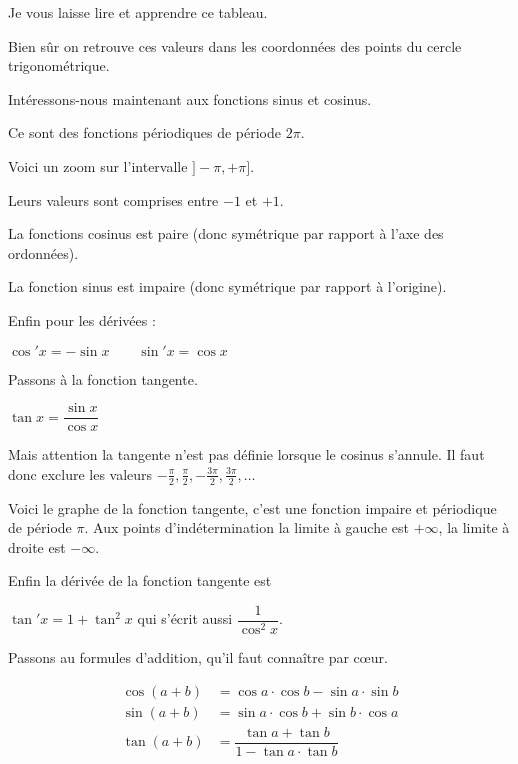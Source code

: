 Je vous laisse lire et apprendre ce tableau.

Bien sûr on retrouve ces valeurs
dans les coordonnées des points du cercle trigonométrique.


\diapo

Intéressons-nous maintenant aux fonctions sinus et cosinus.

Ce sont des fonctions périodiques de période $2\pi$.

\change

Voici un zoom sur l'intervalle $]-\pi,+\pi]$.



Leurs valeurs sont comprises entre $-1$ et $+1$.

La fonctions cosinus est paire (donc symétrique par rapport à l'axe des ordonnées).

La fonction sinus est impaire (donc symétrique par rapport à l'origine).

\change

Enfin pour les dérivées :

$\cos' x = -\sin x \qquad \sin'x=\cos x$



\diapo

Passons à la fonction tangente.

$\tan x = \dfrac{\sin x}{\cos x}$

Mais attention la tangente n'est pas définie lorsque le cosinus s'annule.
Il faut donc exclure les valeurs 
$-\frac\pi2, \frac\pi2, -\frac{3\pi}{2}, \frac{3\pi}{2},\ldots $

Voici le graphe de la fonction tangente, c'est une fonction 
impaire et périodique de période $\pi$. Aux points d'indétermination
la limite à gauche est $+\infty$, la limite à droite est $-\infty$.


Enfin la dérivée de la fonction tangente est 

$\tan' x = 1+\tan^2x$ qui s'écrit aussi $\dfrac{1}{\cos^2x}$.


\diapo

Passons au formules d'addition, qu'il faut connaître par c\oe ur.

\begin{align*}
\cos(a+b) &= \cos a \cdot \cos b - \sin a \cdot \sin b \\
\sin(a+b) &= \sin a\cdot \cos b  +  \sin b\cdot\cos a \\
\tan (a+b) &=\dfrac{\tan a + \tan b}{1-\tan a \cdot \tan b}\\
\end{align*}

